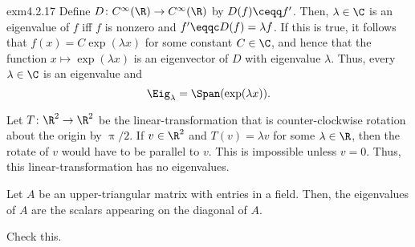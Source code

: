 \begin{exm}{}{exm4.2.17}
	Define $D\colon C^{\infty}(\R )\rightarrow C^{\infty}(\R )$ by $D(f)\ceqq f'$.  Then, $\lambda \in \C$ is an eigenvalue of $f$ iff $f$ is nonzero and $f'\eqqc D(f)=\lambda f$.  If this is true, it follows that $f(x)=C\exp (\lambda x)$ for some constant $C\in \C$, and hence that the function $x\mapsto \exp (\lambda x)$ is an eigenvector of $D$ with eigenvalue $\lambda$.  Thus, every $\lambda \in \C$ is an eigenvalue and
	\begin{equation}
		\Eig _{\lambda}=\Span (\exp (\lambda x)).
	\end{equation}
\end{exm}
\begin{exm}{}{}
	Let $T\colon \R ^2\rightarrow \R ^2$ be the linear-transformation that is counter-clockwise rotation about the origin by $\uppi /2$.  If $v\in \R ^2$ and $T(v)=\lambda v$ for some $\lambda \in \R$, then the rotate of $v$ would have to be parallel to $v$.  This is impossible unless $v=0$.  Thus, this linear-transformation has no eigenvalues.
\end{exm}
\begin{exm}{}{}
	Let $A$ be an upper-triangular matrix with entries in a field.  Then, the eigenvalues of $A$ are the scalars appearing on the diagonal of $A$.
	\begin{exr}[breakable=false]{}{}
		Check this.
	\end{exr}
\end{exm}

